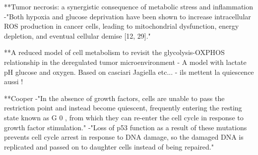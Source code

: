 \documentclass[11pt,a4paper]{article}
\begin{document}
**Tumor necrosis: a synergistic consequence of metabolic stress and inflammation
-"Both hypoxia and glucose deprivation have been shown to increase intracellular ROS production in cancer cells, leading to mitochondrial dysfunction, energy depletion, and eventual cellular demise [12, 29]."

**A reduced model of cell metabolism to revisit the glycolysis-OXPHOS relationship in the deregulated tumor microenvironment
- A model with lactate pH glucose and oxygen. Based on casciari Jagiella etc...
- ils mettent la quiescence aussi !

**Cooper
-"In the absence of growth factors, cells are unable to pass the restriction point and instead become quiescent, frequently entering the resting state known as G 0 , from which they can re-enter the cell cycle in response to growth factor stimulation."
-"Loss of p53 function as a result of these mutations prevents cell cycle arrest in response to DNA damage, so the damaged DNA is replicated and passed on to daughter cells instead of being repaired."
 
\end{document}
